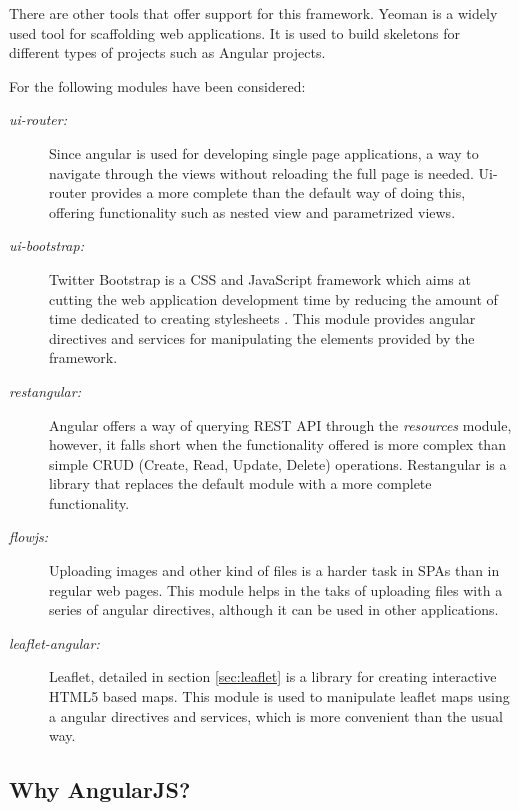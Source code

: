 There are other tools that offer support for this framework. Yeoman is a widely used tool for scaffolding web applications. It is used to build skeletons for different types of projects such as Angular projects.

For the following modules have been considered:

\begin{description}
\item[\textit{ui-router:}] Since angular is used for developing single page applications, a way to navigate through the views without reloading the full page is needed. Ui-router provides a more complete than the default way of doing this, offering functionality such as nested view and parametrized views.

\item[\textit{ui-bootstrap:}] Twitter Bootstrap is a CSS and JavaScript framework which aims at cutting the web application development time by reducing the amount of time dedicated to creating stylesheets \cite{twbts}. This module provides angular directives and services for manipulating the elements provided by the framework.

\item[\textit{restangular:}] Angular offers a way of querying REST API through the \textit{resources} module, however, it falls short when the functionality offered is more complex than simple CRUD (Create, Read, Update, Delete) operations. Restangular is a library that replaces the default module with a more complete functionality.

\item[\textit{flowjs:}] Uploading images and other kind of files is a harder task in SPAs than in regular web pages. This module helps in the taks of uploading files with a series of angular directives, although it can be used in other applications.

\item[\textit{leaflet-angular:}] Leaflet, detailed in section \ref{sec:leaflet} is a library for creating interactive HTML5 based maps. This module is used to manipulate leaflet maps using a angular directives and services, which is more convenient than the usual way.

\end{description}

\subsection*{Why AngularJS?}

